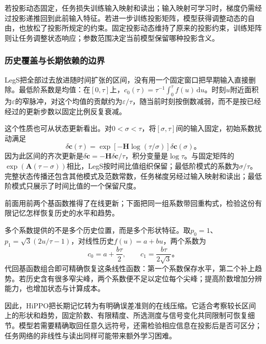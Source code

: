 若投影动态固定，任务损失训练输入映射和读出；输入映射可学习时，梯度仍需经过投影递推回到此前输入特征。若进一步训练投影矩阵，模型获得调整动态的自由，也放松了投影所规定的约束。固定投影动态维持了原来的投影约束，训练矩阵则让任务调整状态响应；参数范围决定当前模型保留哪种投影含义。

\subsubsection{历史覆盖与长期依赖的边界}
\label{sec:rnn-hippo-long-memory}

LegS把全部过去放进随时间扩张的区间，没有用一个固定窗口把早期输入直接删除。最低阶系数是均值：在$[0,\tau]$上，$c_0(\tau)=\tau^{-1}\int_0^\tau f(u)\,\mathrm du$。时刻$u$附近面积为$\varepsilon$的窄脉冲，对这个均值的贡献约为$\varepsilon/\tau$，随当前时刻按倒数减弱，而不是按已经经过的更新步数以固定比例反复衰减。

这个性质也可从状态更新看出。对$0<\sigma<\tau$，将$[\sigma,\tau]$间的输入固定，初始系数扰动满足
\begin{equation}
  \delta\bm c(\tau)
    =\exp\!\left[-\bm H\log(\tau/\sigma)\right]\delta\bm c(\sigma)\text{。}
  \label{eq:rnn-hippo-time-ratio}
\end{equation}
因为此区间的齐次更新是$\delta\dot{\bm c}=-\bm H\delta\bm c/\tau$，积分变量是$\log\tau$。与固定矩阵的$\exp(\bm A(\tau-\sigma))$相比，LegS按时间比值组织保留；最低阶模式的系数为$\sigma/\tau$。完整状态传播还包含其他模式及范数常数，任务梯度另经过输入映射和读出；最低阶模式只展示了时间比值的一个保留尺度。

前面用前两个基函数推得了在线更新；下面把同一组系数带回重构式，检验这份有限记忆怎样恢复历史的水平和趋势。

多个系数提供的不是多个历史位置，而是多个形状特征。取$p_0=1$、$p_1=\sqrt3(2u/\tau-1)$，对线性历史$f(u)=a+bu$，两个系数为
\begin{equation}
  c_0=a+\frac{b\tau}{2},\qquad c_1=\frac{b\tau}{2\sqrt3}\text{。}
  \label{eq:rnn-hippo-linear-example}
\end{equation}
代回基函数组合即可精确恢复这条线性函数：第一个系数保存水平，第二个补上趋势。若历史含有很多窄尖峰，两个系数便不足以定位每个尖峰；提高阶数增加分辨能力，也增加状态与计算成本。

因此，HiPPO把长期记忆转为有明确误差准则的在线压缩。它适合考察较长区间上的形状和趋势，固定阶数、有限精度、所选测度与信号变化共同限制可恢复细节。模型若需要精确取回任意久远符号，还需检验相应信息在投影后是否可区分；任务网络的非线性与读出同样可能带来额外学习困难。

